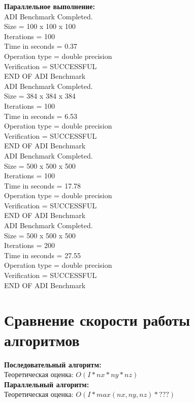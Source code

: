 \documentclass[a4paper,12pt,titlepage,draft]{article}
\begin{document}
\begin{minipage}{.45\textwidth}
\textbf{Параллельное выполнение:}\\

 ADI Benchmark Completed.\\
 Size            =  100 x  100 x  100\\
 Iterations      =                100\\
 Time in seconds =               0.37\\
 Operation type  =   double precision\\
 Verification    =         SUCCESSFUL\\
 END OF ADI Benchmark\\

 ADI Benchmark Completed.\\
 Size            =  384 x  384 x  384\\
 Iterations      =                100\\
 Time in seconds =               6.53\\
 Operation type  =   double precision\\
 Verification    =         SUCCESSFUL\\
 END OF ADI Benchmark\\

 ADI Benchmark Completed.\\
 Size            =  500 x  500 x  500\\
 Iterations      =                100\\
 Time in seconds =              17.78\\
 Operation type  =   double precision\\
 Verification    =         SUCCESSFUL\\
 END OF ADI Benchmark\\

 ADI Benchmark Completed.\\
 Size            =  500 x  500 x  500\\
 Iterations      =                200\\
 Time in seconds =             27.55\\
 Operation type  =   double precision\\
 Verification    =         SUCCESSFUL\\
 END OF ADI Benchmark\\

\end{minipage}
\newpage
\section{Сравнение скорости работы алгоритмов}
\textbf{Последовательный алгоритм:}\\

Теоретическая оценка: $O(I * nx * ny * nz)$\\

\textbf{Параллельный алгоритм:}\\

Теоретическая оценка: $O(I * max(nx, ny, nz) * ???)$
\end{document}
